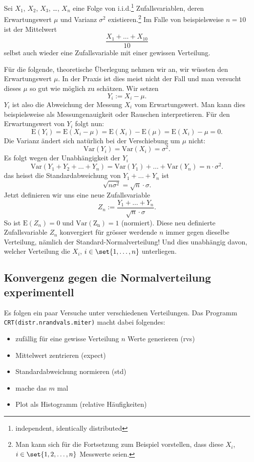 \documentclass[%
11pt,%
twoside,%
titlepage,%
german,%
headsepline%
]{scrartcl}
\newcounter{theo}[section]\setcounter{theo}{0}
\newcommand{\definition}[1]{\colorbox{emerald}{#1}}
\begin{document}
Sei $X_1$, $X_2$, $X_3$, \dots , $X_n$ eine Folge von i.i.d.\footnote{independent, identically distributed} Zufallsvariablen, deren Erwartungswert $\mu$ und Varianz $\sigma^2$ existieren.\footnote{Man kann sich für die Fortsetzung zum Beispiel vorstellen, dass diese $X_i$, $i\in\set{1,2,\dots,n}$ Messwerte seien.} Im Falle von beispielsweise $n=10$ ist der Mittelwert
$$\frac{X_1+\dots+X_{10}}{10}$$
selbst auch wieder eine Zufallsvariable mit einer gewissen Verteilung.

Für die folgende, theoretische Überlegung nehmen wir an, wir wüssten den Erwartungswert $\mu$. In der Praxis ist dies meist nicht der Fall und man versucht dieses $\mu$ so gut wie möglich zu schätzen. Wir setzen
$$Y_i:=X_i-\mu.$$
$Y_i$ ist also die Abweichung der Messung $X_i$ vom Erwartungswert. Man kann dies beispielsweise als Messungenauigkeit oder Rauschen interpretieren. Für den Erwartungswert von $Y_i$ folgt nun:
$$\mathrm{E}(Y_i)=\mathrm{E}(X_i-\mu)=\mathrm{E}(X_i)-\mathrm{E}(\mu)=\mathrm{E}(X_i)-\mu=0.$$
Die Varianz ändert sich natürlich bei der Verschiebung um $\mu$ nicht:
$$\mathrm{Var}(Y_i)=\mathrm{Var}(X_i)=\sigma^2.$$
Es folgt wegen der Unabhängigkeit der $Y_i$
$$\mathrm{Var}(Y_1+Y_2+\dots+Y_n)=\mathrm{Var}(Y_1)+\dots+\mathrm{Var}(Y_n)=n\cdot\sigma^2.$$
das heisst die Standardabweichung von $Y_1+\dots+Y_n$ ist
$$\sqrt{n\sigma^2}=\sqrt{n}\cdot\sigma.$$
Jetzt definieren wir uns eine neue Zufallsvariable
$$Z_n:=\frac{Y_1+\dots+Y_n}{\sqrt{n}\cdot\sigma}.$$
So ist $\mathrm{E}(Z_n)=0$ und $\mathrm{Var(Z_n)}=1$ (normiert). Diese neu definierte Zufallsvariable $Z_n$ konvergiert für grösser werdende $n$ immer gegen dieselbe Verteilung, nämlich der \definition{Standard-Normalverteilung}! Und dies unabhängig davon, welcher Verteilung die $X_i$, $i\in\set{1,\dots,n}$ unterliegen.

\subsection{Konvergenz gegen die Normalverteilung experimentell}

Es folgen ein paar Versuche unter verschiedenen Verteilungen. Das Programm \texttt{CRT(distr.nrandvals.miter)} macht dabei folgendes:
\begin{itemize}
    \item zufällig für eine gewisse Verteilung $n$ Werte generieren (rvs)
    \item Mittelwert zentrieren (expect)
    \item Standardabweichung normieren (std)
    \item mache das $m$ mal
    \item Plot als Histogramm (relative Häufigkeiten)
\end{itemize}
\end{document}
